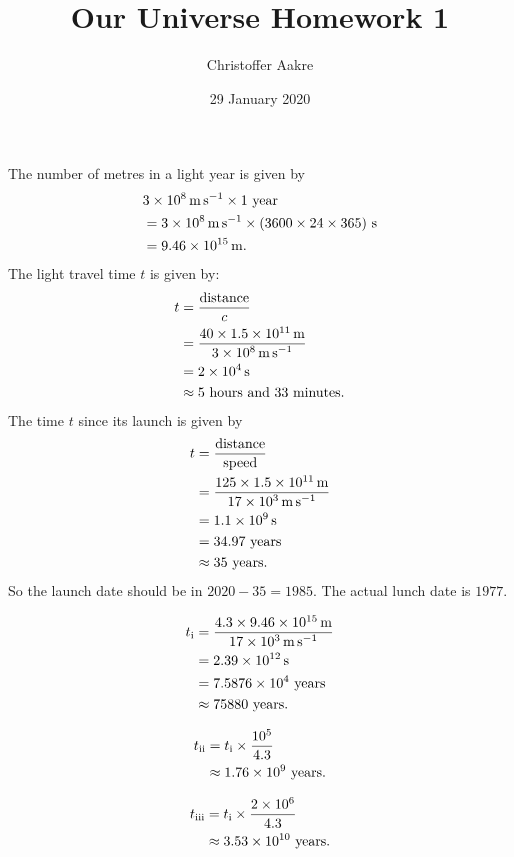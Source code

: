 \documentclass{templates/homework}
\title{Our Universe Homework 1}
\author{Christoffer Aakre}
\date{29 January 2020}
\begin{document}
\maketitle

\exercise 
\exercisepart
The number of metres in a light year is given by
\begin{align*}
    &\SI{3E8}{\meter\per\second} \times 1 \text{ year} \\
    &= \SI{3E8}{\meter\per\second} \times (3600 \times 24 \times 365) \text{ s} \\
    &= \SI{9.46E15}{\meter}.
\end{align*}
\exercisepart
The light travel time $t$ is given by:
\begin{align*}
    t &= \frac{\text{distance}}{c} \\
    &= \frac{40 \times \SI{1.5E11}{\meter}}{\SI{3E8}{\meter\per\second}} \\
    &= \SI{2E4}{\second} \\
    &\approx \text{5 hours and 33 minutes}.
\end{align*}
\exercisepart
The time $t$ since its launch is given by
\begin{align*}
    t &= \frac{\text{distance}}{\text{speed}} \\
    &= \frac{125 \times \SI{1.5E11}{\meter}}{\SI{17E3}{\meter\per\second}} \\
    &= \SI{1.1E9}{\second} \\
    &= \text{34.97 years} \\
    &\approx \text{35 years}.
\end{align*}
So the launch date should be in $2020 - 35 = 1985$. The actual
lunch date is $1977$.
\begin{subexercises}
    \item \begin{align*}
        t_\text{i} &= \frac{4.3 \times \SI{9.46E15}{\meter}}{\SI{17E3}{\meter\per\second}} \\
        &= \SI{2.39E12}{\second} \\
        &= \SI{7.5876E4}{} \text{ years} \\
        &\approx \text{75880 years}. \\
        \end{align*}
    \item 
    \begin{align*}
        t_\text{ii} &= t_\text{i} \times \frac{10^5}{4.3} \\
        &\approx \SI{1.76E9}{} \text{ years}.
    \end{align*}
    \item
    \begin{align*}
        t_\text{iii} &= t_\text{i} \times \frac{2 \times 10^6}{4.3} \\
        &\approx \SI{3.53E10}{} \text{ years}.
    \end{align*}
\end{subexercises}
\end{document}
